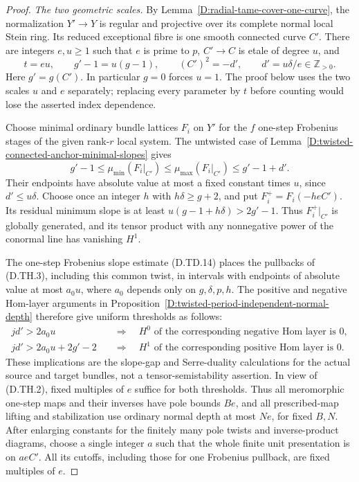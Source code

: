 \begin{proof}
\emph{The two geometric scales.}
By Lemma~\ref{D:radial-tame-cover-one-curve}, the normalization
$Y'\to Y$ is regular and projective over its complete normal
local Stein ring. Its reduced exceptional fibre is one smooth
connected curve $C'$. There are integers $e,u\geq1$ such that
$e$ is prime to $p$, $C'\to C$ is etale of degree $u$, and
\[
 t=eu,\qquad g'-1=u(g-1),\qquad
 (C')^2=-d',\qquad d'=u\delta/e\in\mathbb Z_{>0}.
                                                        \tag{D.TH.2}
\]
Here $g'=g(C')$. In particular $g=0$ forces $u=1$.
The proof below uses the two scales $u$ and $e$ separately;
replacing every parameter by $t$ before counting would lose
the asserted index dependence.

Choose minimal ordinary bundle lattices $F_i$ on $Y'$ for
the $f$ one-step Frobenius stages of the given rank-$r$
local system. The untwisted case of
Lemma~\ref{D:twisted-connected-anchor-minimal-slopes} gives
\[
       g'-1\leq\mu_{\min}(F_i|_{C'})
       \leq\mu_{\max}(F_i|_{C'})\leq g'-1+d'.
                                                        \tag{D.TH.3}
\]
Their endpoints have absolute value at most a fixed constant
times $u$, since $d'\leq u\delta$. Choose once an integer
$h$ with $h\delta\geq g+2$, and put
$F_i^+=F_i(-heC')$. Its residual minimum slope is at least
$u(g-1+h\delta)>2g'-1$. Thus $F_i^+|_{C'}$ is globally
generated, and its tensor product with any nonnegative
power of the conormal line has vanishing $H^1$.

The one-step Frobenius slope estimate (D.TD.14) places the
pullbacks of (D.TH.3), including this common twist, in
intervals with endpoints of absolute value at most $a_0u$,
where $a_0$ depends only on $g,\delta,p,h$. The positive
and negative Hom-layer arguments in
Proposition~\ref{D:twisted-period-independent-normal-depth}
therefore give uniform thresholds as follows:
\[
 \begin{split}
 j d'>2a_0u&\quad\Longrightarrow\quad
          H^0\text{ of the corresponding negative Hom layer is }0,\\
 j d'>2a_0u+2g'-2&\quad\Longrightarrow\quad
          H^1\text{ of the corresponding positive Hom layer is }0.
 \end{split}                                            \tag{D.TH.4}
\]
These implications are the slope-gap and Serre-duality
calculations for the actual source and target bundles, not
a tensor-semistability assertion. In view of (D.TH.2), fixed
multiples of $e$ suffice for both thresholds. Thus all
meromorphic one-step maps and their inverses have pole bounds
$Be$, and all prescribed-map lifting and stabilization use
ordinary normal depth at most $Ne$, for fixed $B,N$.
After enlarging constants for the finitely many pole twists
and inverse-product diagrams, choose a single integer $a$
such that the whole finite unit presentation is on $aeC'$.
All its cutoffs, including those for one Frobenius pullback,
are fixed multiples of $e$.


\end{proof}
